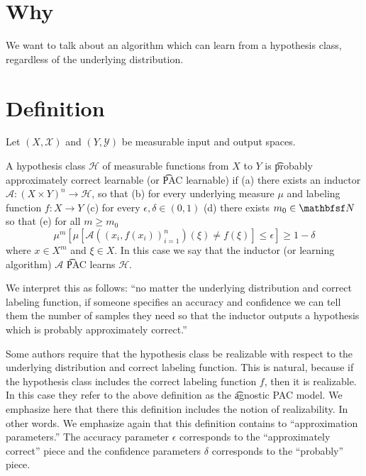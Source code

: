 

\section*{Why}

We want to talk about an algorithm which can learn from a hypothesis class, regardless of the underlying distribution.

  \section*{Definition}

Let $(X, \mathcal{X} )$ and $(Y, \mathcal{Y} )$ be measurable input and output spaces.

A hypothesis class $\mathcal{H} $ of measurable functions from $X$ to $Y$ is \t{probably approximately correct learnable} (or \t{PAC learnable}) if
(a) there exists an inductor $\mathcal{A} : (X \times  Y)^n \to \mathcal{H} $, so that (b) for every underlying measure $\mu $ and labeling function $f: X \to Y$ (c) for every $\epsilon , \delta  \in (0, 1)$ (d) there exists $m_0 \in \N  $ so that (e) for all $m \geq m_0$
\[
\mu ^m\left[
\mu \left[
\mathcal{A} ((x_i, f(x_i))_{i = 1}^{n})(\xi ) \neq f(\xi )
\right]
\leq \epsilon  \right] \geq 1-\delta
\]
where $x \in X^m$ and $\xi  \in X$.
In this case we say that the inductor (or learning algorithm) $\mathcal{A} $ \t{PAC learns} $\mathcal{H} $.

We interpret this as follows: ``no matter the underlying distribution and correct labeling function, if someone specifies an accuracy and confidence we can tell them the number of samples they need so that the inductor outputs a hypothesis which is probably approximately correct.''

Some authors require that the hypothesis class be realizable with respect to the underlying distribution and correct labeling function.
This is natural, because if the hypothesis class includes the correct labeling function $f$, then it is realizable.
In this case they refer to the above definition as the \t{agnostic PAC model}.
We emphasize here that there this definition includes the notion of realizability.
In other words.
We emphasize again that this definition contains to ``approximation parameters.''
The accuracy parameter $\epsilon $ corresponds to the ``approximately correct'' piece and the confidence parameters $\delta $ corresponds to the ``probably'' piece.

